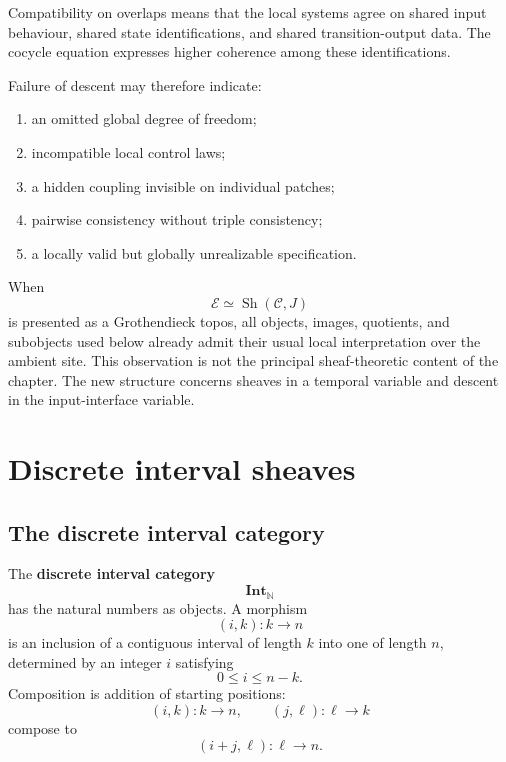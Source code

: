 Compatibility on overlaps means that the local systems agree on shared input
behaviour, shared state identifications, and shared transition-output data.
The cocycle equation expresses higher coherence among these identifications.

Failure of descent may therefore indicate:
\begin{enumerate}
    \item an omitted global degree of freedom;
    \item incompatible local control laws;
    \item a hidden coupling invisible on individual patches;
    \item pairwise consistency without triple consistency;
    \item a locally valid but globally unrealizable specification.
\end{enumerate}

\begin{remark}
\label{rem:ambient-sheaf-semantics}
When
\[
    \mathcal E\simeq\operatorname{Sh}(\mathcal C,J)
\]
is presented as a Grothendieck topos, all objects, images, quotients, and
subobjects used below already admit their usual local interpretation over the
ambient site. This observation is not the principal sheaf-theoretic content
of the chapter. The new structure concerns sheaves in a temporal variable and
descent in the input-interface variable.
\end{remark}

\section{Discrete interval sheaves}
\label{sec:discrete-interval-sheaves}

\subsection{The discrete interval category}
\label{subsec:discrete-interval-category}

\begin{definition}
\label{def:discrete-interval-category}
The \textbf{discrete interval category}
\[
    \mathbf{Int}_{\mathbb N}
\]
has the natural numbers as objects. A morphism
\[
    (i,k):k\longrightarrow n
\]
is an inclusion of a contiguous interval of length \(k\) into one of length
\(n\), determined by an integer \(i\) satisfying
\[
    0\leq i\leq n-k.
\]
Composition is addition of starting positions:
\[
    (i,k):k\to n,
    \qquad
    (j,\ell):\ell\to k
\]
compose to
\[
    (i+j,\ell):\ell\to n.
\]
\end{definition}

